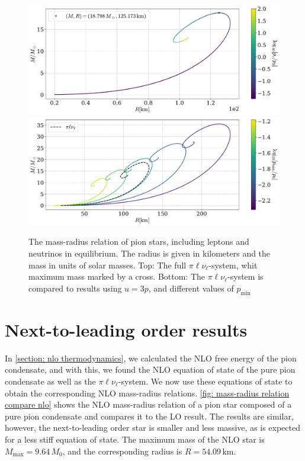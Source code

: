 \begin{figure}[H]
    \centering
    \includegraphics[width=.85\textwidth]{../scripts/figurer/pion_star/mass_radius_neutrino.pdf}
    \includegraphics[width=.85\textwidth]{../scripts/figurer/pion_star/mass_radius_light.pdf}
    \caption{
        The mass-radius relation of pion stars, including leptons and neutrinos in equilibrium.
        The radius is given in kilometers and the mass in units of solar masses.
        Top: The full $\pi\ell\nu_\ell$-system, whit maximum mass marked by a cross.
        Bottom: The $\pi\ell\nu_\ell$-system is compared to results using $u=3p$, and different values of $p_\text{min}$
        }
        \label{fig: mass radius neutrino}
\end{figure}



\section{Next-to-leading order results}

In \autoref{section: nlo thermodynamics}, we calculated the NLO free energy of the pion condensate, and with this, we found the NLO equation of state of the pure pion condensate as well as the $\pi\ell\nu_\ell$-system.
We now use these equations of state to obtain the corresponding NLO mass-radius relations.
\autoref{fig: mass-radius relation compare nlo} shows the NLO mass-radius relation of a pion star composed of a pure pion condensate and compares it to the LO result.
The results are similar, however, the next-to-leading order star is smaller and less massive, as is expected for a less stiff equation of state.
The maximum mass of the NLO star is $M_\text{max} = 9.64\, M_0$, and the corresponding radius is $R = 54.09\,\text{km}$.

